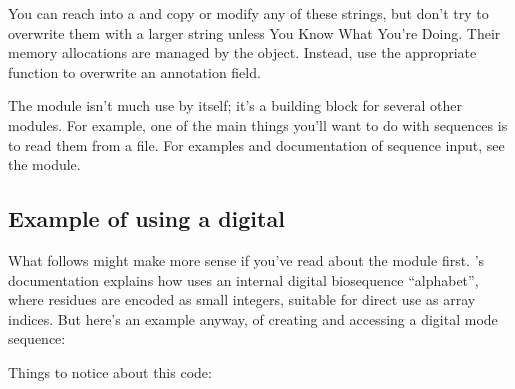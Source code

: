 You can reach into a  and copy or modify any of these
strings, but don't try to overwrite them with a larger string unless
You Know What You're Doing. Their memory allocations are managed by
the  object. Instead, use the appropriate
 function to overwrite an annotation field.


The  module isn't much use by itself; it's a building block
for several other modules. For example, one of the main things you'll
want to do with sequences is to read them from a file. For examples
and documentation of sequence input, see the  module.


\subsection{Example of using a digital }

What follows might make more sense if you've read about the
 module first. 's documentation
explains how \Easel uses an internal digital biosequence ``alphabet'',
where residues are encoded as small integers, suitable for direct use
as array indices. But here's an example anyway, of creating and
accessing a digital mode sequence:



Things to notice about this code:

